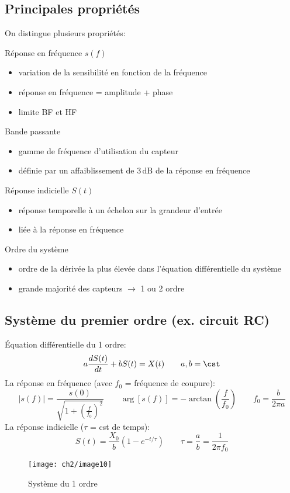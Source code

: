 \subsection{Principales propriétés}
On distingue plusieurs propriétés:
\begin{description}
	\item Réponse en fréquence $s(f)$
	\begin{itemize}
		\item variation de la sensibilité en fonction de la fréquence
		\item réponse en fréquence = amplitude + phase
		\item limite BF et HF
	\end{itemize}
	\item Bande passante
	\begin{itemize}
		\item gamme de fréquence d'utilisation du capteur
		\item définie par un affaiblissement de $3\,\mathrm{dB}$ de la réponse en fréquence
	\end{itemize}
	\item Réponse indicielle $S(t)$
	\begin{itemize}
		\item réponse temporelle à un échelon sur la grandeur d'entrée
		\item liée à la réponse en fréquence
	\end{itemize}
	\item Ordre du système
	\begin{itemize}
		\item ordre de la dérivée la plus élevée dans l'équation différentielle du système
		\item grande majorité des capteurs $\rightarrow$ 1 ou 2 ordre
	\end{itemize}
\end{description}
\subsection{Système du premier ordre (ex. circuit RC)}
Équation différentielle du 1 ordre:
\[
a\frac{d S(t)}{dt} + b S(t) = X(t)\qquad a, b=\cst
\]
La réponse en fréquence (avec $f_0$ = fréquence de coupure):
\[
|s(f)|=\frac{s(0)}{\sqrt{1+\left(\frac{f}{f_0}\right)^2}}\qquad \arg[s(f)] = -\arctan\left(\frac{f}{f_0}\right)\qquad f_0=\frac{b}{2\pi a}
\]
La réponse indicielle ($\tau$ = cst de temps):
\[
S(t) = \frac{X_0}{b}\left(1-e^{-t/\tau}\right)\qquad \tau =\frac{a}{b}=\frac{1}{2\pi f_0}
\]
\begin{figure}[H] 
	\centering 
	\texttt{[image: ch2/image10]} 
	\caption{Système du 1 ordre} 
\end{figure}
